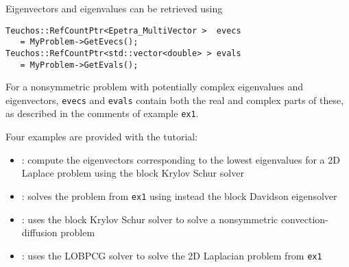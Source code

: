 Eigenvectors and eigenvalues can be retrieved using
\begin{verbatim}
Teuchos::RefCountPtr<Epetra_MultiVector >  evecs 
   = MyProblem->GetEvecs();
Teuchos::RefCountPtr<std::vector<double> > evals 
   = MyProblem->GetEvals();
\end{verbatim}
For a nonsymmetric problem with potentially complex eigenvalues and
eigenvectors, \verb!evecs! and \verb!evals! contain both the real and complex
parts of these, as described in the comments of example \verb!ex1!.

Four examples are provided with the tutorial:
\begin{itemize}
\item {}: compute the eigenvectors
corresponding to the lowest eigenvalues for a 2D Laplace problem using the block
Krylov Schur solver
\item {}: solves the problem from \verb!ex1! 
using instead the block Davidson eigensolver
\item {}: uses the block Krylov Schur solver to solve a nonsymmetric convection-diffusion problem
\item {}: uses the LOBPCG solver to solve the 2D Laplacian
problem from \verb!ex1!
\end{itemize}










